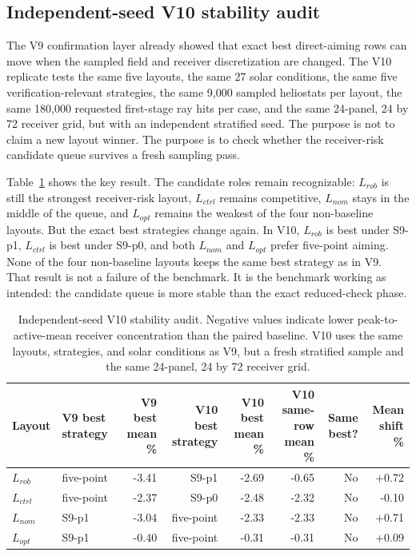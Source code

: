 \documentclass[final,3p,times]{elsarticle}
\begin{document}
\subsection{Independent-seed V10 stability audit}
The V9 confirmation layer already showed that exact best direct-aiming rows can move when the sampled field and receiver discretization are changed. The V10 replicate tests the same five layouts, the same 27 solar conditions, the same five verification-relevant strategies, the same 9,000 sampled heliostats per layout, the same 180,000 requested first-stage ray hits per case, and the same 24-panel, 24 by 72 receiver grid, but with an independent stratified seed. The purpose is not to claim a new layout winner. The purpose is to check whether the receiver-risk candidate queue survives a fresh sampling pass.

Table~\ref{tab:v10-stability} shows the key result. The candidate roles remain recognizable: $L_{rob}$ is still the strongest receiver-risk layout, $L_{ctrl}$ remains competitive, $L_{nom}$ stays in the middle of the queue, and $L_{opt}$ remains the weakest of the four non-baseline layouts. But the exact best strategies change again. In V10, $L_{rob}$ is best under S9-p1, $L_{ctrl}$ is best under S9-p0, and both $L_{nom}$ and $L_{opt}$ prefer five-point aiming. None of the four non-baseline layouts keeps the same best strategy as in V9. That result is not a failure of the benchmark. It is the benchmark working as intended: the candidate queue is more stable than the exact reduced-check phase.

\begin{table}[t]
\centering
\caption{Independent-seed V10 stability audit. Negative values indicate lower peak-to-active-mean receiver concentration than the paired baseline. V10 uses the same layouts, strategies, and solar conditions as V9, but a fresh stratified sample and the same 24-panel, 24 by 72 receiver grid.}
\label{tab:v10-stability}
\scriptsize
\begin{tabular*}{\textwidth}{@{\extracolsep{\fill}}llrrrrrr@{}}
\toprule
Layout & V9 best strategy & V9 best mean \% & V10 best strategy & V10 best mean \% & V10 same-row mean \% & Same best? & Mean shift \% \\
\midrule
$L_{rob}$ & five-point & -3.41 & S9-p1 & -2.69 & -0.65 & No & +0.72 \\
$L_{ctrl}$ & five-point & -2.37 & S9-p0 & -2.48 & -2.32 & No & -0.10 \\
$L_{nom}$ & S9-p1 & -3.04 & five-point & -2.33 & -2.33 & No & +0.71 \\
$L_{opt}$ & S9-p1 & -0.40 & five-point & -0.31 & -0.31 & No & +0.09 \\
\bottomrule
\end{tabular*}
\end{table}
\end{document}
